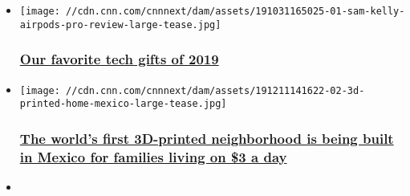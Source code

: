 \begin{itemize}
\item
  \href{/2019/12/14/tech/tech-gifts-2019/index.html}{}

  \texttt{[image: //cdn.cnn.com/cnnnext/dam/assets/191031165025-01-sam-kelly-airpods-pro-review-large-tease.jpg]}

  \hypertarget{our-favorite-tech-gifts-of-2019}{%
  \subsubsection{\texorpdfstring{\href{/2019/12/14/tech/tech-gifts-2019/index.html}{Our
  favorite tech gifts of
  2019}}{Our favorite tech gifts of 2019}}\label{our-favorite-tech-gifts-of-2019}}
\item
  \href{/2019/12/12/business/worlds-first-3d-printed-neighborhood-trnd/index.html}{}

  \texttt{[image: //cdn.cnn.com/cnnnext/dam/assets/191211141622-02-3d-printed-home-mexico-large-tease.jpg]}

  \hypertarget{the-worlds-first-3d-printed-neighborhood-is-being-built-in-mexico-for-families-living-on-3-a-day}{%
  \subsubsection{\texorpdfstring{\href{/2019/12/12/business/worlds-first-3d-printed-neighborhood-trnd/index.html}{The
  world's first 3D-printed neighborhood is being built in Mexico for
  families living on \$3 a
  day}}{The world's first 3D-printed neighborhood is being built in Mexico for families living on \$3 a day}}\label{the-worlds-first-3d-printed-neighborhood-is-being-built-in-mexico-for-families-living-on-3-a-day}}
\item
\end{itemize}

